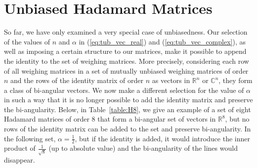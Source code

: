 \section{Unbiased Hadamard Matrices}\label{sec:weakly-unbiased}

So far, we have only examined a very special case of unbiasedness. Our selection of the values of $n$ and $\alpha$ in (\ref{eq:tub_vec_real}) and (\ref{eq:tub_vec_complex}), as well as imposing a certain structure to our matrices, make it possible to append the identity to the set of weighing matrices. More precisely, considering each row of all weighing matrices in a set of mutually unbiased weighing matrices of order $n$ and the rows of the identity matrix of order $n$  as vectors in $\mathbb{R}^n$ or $\mathbb{C}^n$, they form a class of bi-angular vectors. We now make a different selection for the value of $\alpha$ in such a way that it is no longer possible to add the identity matrix and preserve the bi-angularity. Below, in Table~\ref{table:H8}, we give an example of a set of eight Hadamard matrices of order 8 that form a bi-angular set of vectors in $\mathbb{R}^8$, but no rows of the identity matrix can be added to the set and preserve bi-angularity. In the following set, $\alpha=\frac12$, but if the identity is added, it would introduce the inner product of $\frac{1}{\sqrt{8}}$ (up to absolute value) and the bi-angularity of the lines would disappear.



